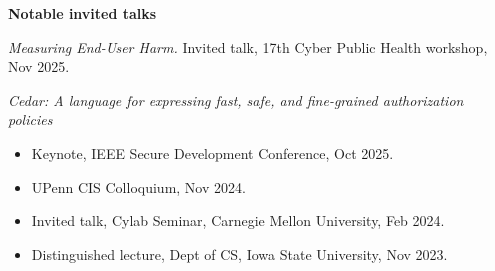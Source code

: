\documentclass[11pt]{article}
\begin{document}
\begin{description}
\setlength{\labelsep}{0ex}
\setlength{\itemsep}{-0.5ex}

\item {\bf\textsf Notable invited talks}

\item \textit{Measuring End-User Harm.} Invited talk, 17th Cyber Public Health workshop, Nov 2025.
\item \textit{Cedar: A language for expressing fast, safe, and
    fine-grained authorization policies}
        \begin{itemize}
            \item Keynote, IEEE Secure Development Conference, Oct 2025.
            \item UPenn CIS Colloquium, Nov 2024.
            \item Invited talk, Cylab Seminar, Carnegie Mellon University, Feb 2024.
            \item Distinguished lecture, Dept of CS, Iowa State
              University, Nov 2023.
         \end{itemize}


\end{description}
\end{document}
